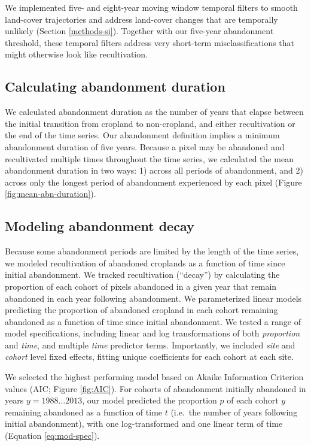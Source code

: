 \documentclass[9pt,twocolumn,twoside,]{pnas-new}
\begin{document}
We implemented five- and eight-year moving window temporal filters to smooth land-cover trajectories and address land-cover changes that are temporally unlikely (Section \ref{methods-si}).
Together with our five-year abandonment threshold, these temporal filters address very short-term misclassifications that might otherwise look like recultivation.

\hypertarget{calculating-abandonment-duration}{%
\subsection{Calculating abandonment duration}\label{calculating-abandonment-duration}}

We calculated abandonment duration as the number of years that elapse between the initial transition from cropland to non-cropland, and either recultivation or the end of the time series.
Our abandonment definition implies a minimum abandonment duration of five years.
Because a pixel may be abandoned and recultivated multiple times throughout the time series, we calculated the mean abandonment duration in two ways: 1) across all periods of abandonment, and 2) across only the longest period of abandonment experienced by each pixel (Figure \ref{fig:mean-abn-duration}).

\hypertarget{modeling-abandonment-decay}{%
\subsection{Modeling abandonment decay}\label{modeling-abandonment-decay}}

Because some abandonment periods are limited by the length of the time series, we modeled recultivation of abandoned croplands as a function of time since initial abandonment.
We tracked recultivation (``decay'') by calculating the proportion of each cohort of pixels abandoned in a given year that remain abandoned in each year following abandonment.
We parameterized linear models predicting the proportion of abandoned cropland in each cohort remaining abandoned as a function of time since initial abandonment.
We tested a range of model specifications, including linear and log transformations of both \emph{proportion} and \emph{time}, and multiple \emph{time} predictor terms.
Importantly, we included \emph{site} and \emph{cohort} level fixed effects, fitting unique coefficients for each cohort at each site.

We selected the highest performing model based on Akaike Information Criterion values (AIC; Figure \ref{fig:AIC}).
For cohorts of abandonment initially abandoned in years \(y = 1988 ... 2013\), our model predicted the proportion \(p\) of each cohort \(y\) remaining abandoned as a function of time \(t\) (i.e.~the number of years following initial abandonment), with one log-transformed and one linear term of time (Equation \eqref{eq:mod-spec}).
\end{document}
